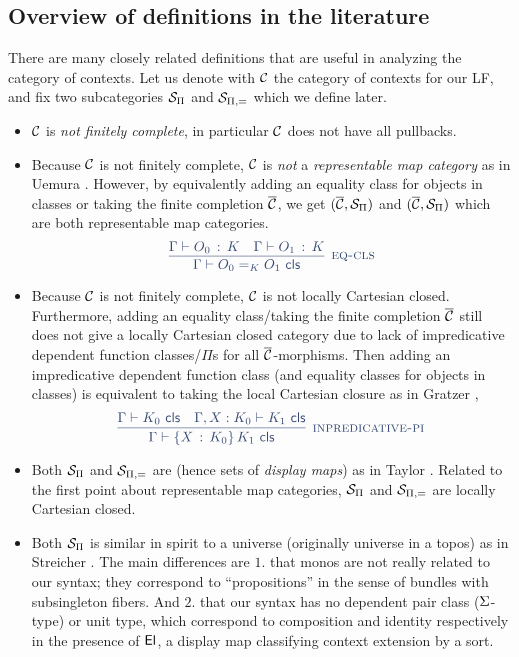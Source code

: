\subsection{Overview of definitions in the literature}
There are many closely related definitions that are useful in analyzing the category of contexts.
Let us denote with $\mathcal{C}$ the category of contexts for our LF,
and fix two subcategories $\mathcal{S}_{\Pi}$ and $\mathcal{S}_{\Pi,=}$ which we define later.
\begin{itemize}
  \item $\mathcal{C}$ is \textit{not finitely complete}, in particular $\mathcal{C}$ does not have all pullbacks.
  \item Because $\mathcal{C}$ is not finitely complete, $\mathcal{C}$ is
        \textit{not} a \textit{representable map category}
        as in Uemura \cite{uemura2019general}.
        However, by equivalently {\color{syntax} adding an equality class for objects in classes}
        or {\color{semantics} taking the finite completion $\overline{\mathcal{C}}$},
        we get $(\overline{\mathcal{C}},\mathcal{S}_{\Pi})$ and $(\overline{\mathcal{C}},\mathcal{S}_{\Pi})$ which are both representable map categories.
        \[\color{syntax}
            \infer[\textsc{eq-cls}]{\ClsJdg{\Ga}{\EqCS{K}{O_0}{O_1}}}
            {\ObjJdg{\Ga}{O_0}{K} & \ObjJdg{\Ga}{O_1}{K}}
        \]
  \item Because $\mathcal{C}$ is not finitely complete, $\mathcal{C}$ is not locally Cartesian closed.
        Furthermore, adding an equality class/taking the finite completion $\overline{\mathcal{C}}$
        still does not give a locally Cartesian closed category due to lack of
        {\color{syntax} impredicative dependent function classes}/{\color{semantics}$\Pi$s for all $\overline{\mathcal{C}}$-morphisms}.
        Then {\color{syntax} adding an impredicative dependent function class (and equality classes for objects in classes)}
        is equivalent to {\color{semantics} taking the local Cartesian closure as in Gratzer \cite{gratzer2021syntactic}},
        \[\color{syntax}
          \infer[\textsc{inpredicative-pi}]{\ClsJdg{\Ga}{\PiCS{X}{K_{0}}{K_{1}}}}
            {\ClsJdg{\Ga}{K_{0}} & \ClsJdg{\CtxExt{\Ga}{X}{K_{0}}}{K_{1}}}
        \]
  \item Both $\mathcal{S}_{\Pi}$ and $\mathcal{S}_{\Pi,=}$ are \textit{}
        (hence sets of \textit{display maps}) as in Taylor \cite{Taylor1999}.
        Related to the first point about representable map categories,
        $\mathcal{S}_{\Pi}$ and $\mathcal{S}_{\Pi,=}$ are locally Cartesian closed.
  \item Both $\mathcal{S}_{\Pi}$ is similar in spirit to a universe (originally universe in a topos) as in Streicher \cite{streicher}.
        The main differences are $1.$ that {\color{semantics} monos} are not really related to our syntax;
        they correspond to ``propositions'' in the sense of bundles with subsingleton fibers.
        And $2.$ that our syntax has no {\color{syntax} dependent pair class ($\Sigma$-type) or unit type},
        which correspond to {\color{semantics} composition and identity respectively} in the presence of $\mathsf{El}$,
        a display map classifying context extension by a sort.
\end{itemize}

